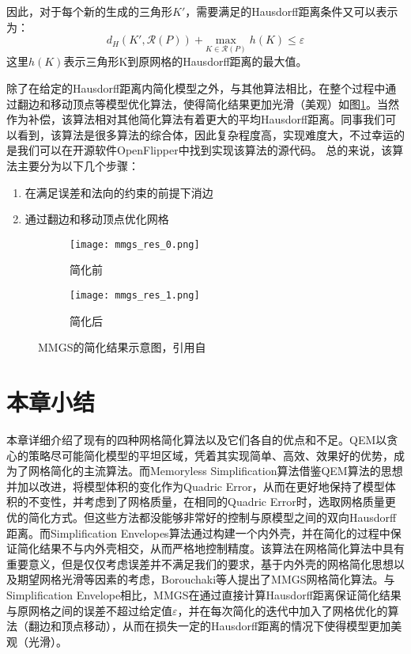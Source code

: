 因此，对于每个新的生成的三角形$K'$，需要满足的Hausdorff距离条件又可以表示为：
\begin{equation}
  d_H(K',\mathcal{R}(P))+\underset{K\in\mathcal{R}(P)}{\text{max}}\;h(K) \le \varepsilon
\end{equation}
这里$h(K)$表示三角形K到原网格的Hausdorff距离的最大值。\par
除了在给定的Hausdorff距离内简化模型之外，与其他算法相比，在整个过程中通过翻边和移动顶点等模型优化算法，使得简化结果更加光滑（美观）如图\ref{fig:mmgs-res}。当然作为补偿，该算法相对其他简化算法有着更大的平均Hausdorff距离。同事我们可以看到，该算法是很多算法的综合体，因此复杂程度高，实现难度大，不过幸运的是我们可以在开源软件OpenFlipper中找到实现该算法的源代码。
总的来说，该算法主要分为以下几个步骤：
\begin{enumerate}[（1）]
  \item 在满足误差和法向的约束的前提下消边
  \item 通过翻边和移动顶点优化网格
\end{enumerate}
\begin{figure}[htbp]
  \centering
  \begin{subfigure}[b]{0.4\textwidth}
    \texttt{[image: mmgs\_res\_0.png]}
    \caption[input]{简化前}
    \end{subfigure}
    \begin{subfigure}[b]{0.4\textwidth}
      \texttt{[image: mmgs\_res\_1.png]}
      \caption[mls]{简化后}
    \end{subfigure}
    \caption[MMGS简化结果]{MMGS的简化结果示意图，引用自\cite{mmgs}}
    \label{fig:mmgs-res}
\end{figure}

\section{本章小结}
本章详细介绍了现有的四种网格简化算法以及它们各自的优点和不足。QEM\cite{qem1}\cite{qem2}以贪心的策略尽可能简化模型的平坦区域，凭着其实现简单、高效、效果好的优势，成为了网格简化的主流算法。而Memoryless Simplification算法\cite{memory-less}借鉴QEM算法的思想并加以改进，将模型体积的变化作为Quadric Error，从而在更好地保持了模型体积的不变性，并考虑到了网格质量，在相同的Quadric Error时，选取网格质量更优的简化方式。但这些方法都没能够非常好的控制与原模型之间的双向Hausdorff距离。而Simplification Envelopes算法\cite{simp-envlop}通过构建一个内外壳，并在简化的过程中保证简化结果不与内外壳相交，从而严格地控制精度。该算法在网格简化算法中具有重要意义，但是仅仅考虑误差并不满足我们的要求，基于内外壳的网格简化思想以及期望网格光滑等因素的考虑，Borouchaki等人提出了MMGS网格简化算法\cite{mmgs}。与Simplification Envelope相比，MMGS在通过直接计算Hausdorff距离保证简化结果与原网格之间的误差不超过给定值$\varepsilon$，并在每次简化的迭代中加入了网格优化的算法（翻边和顶点移动），从而在损失一定的Hausdorff距离的情况下使得模型更加美观（光滑）。
